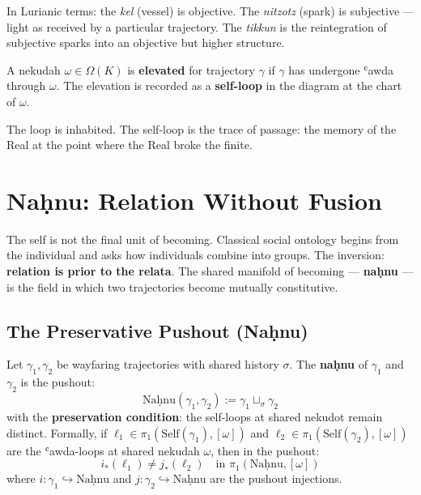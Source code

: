In Lurianic terms: the \emph{kel} (vessel) is objective. The \emph{nitzotz} (spark) is subjective — light as received by a particular trajectory. The \emph{tikkun} is the reintegration of subjective sparks into an objective but higher structure.

\begin{definition}\label{elevated}
A nekudah $\omega \in \Omega(K)$ is \textbf{elevated} for trajectory $\gamma$ if $\gamma$ has undergone ʿawda through $\omega$. The elevation is recorded as a \textbf{self-loop} in the diagram at the chart of $\omega$.
\end{definition}

The loop is inhabited. The self-loop is the trace of passage: the memory of the Real at the point where the Real broke the finite.

\section{Naḥnu: Relation Without Fusion}
\label{sec:nahnu}

The self is not the final unit of becoming. Classical social ontology begins from the individual and asks how individuals combine into groups. The inversion: \textbf{relation is prior to the relata}. The shared manifold of becoming — \textbf{naḥnu} — is the field in which two trajectories become mutually constitutive.

\subsection{The Preservative Pushout (Naḥnu)}

\begin{theorem}\label{thm:nahnu}
Let $\gamma_1, \gamma_2$ be wayfaring trajectories with shared history $\sigma$. The \textbf{naḥnu} of $\gamma_1$ and $\gamma_2$ is the pushout:
\[
\mathrm{Naḥnu}(\gamma_1, \gamma_2) := \gamma_1 \sqcup_\sigma \gamma_2
\]
with the \textbf{preservation condition}: the self-loops at shared nekudot remain distinct. Formally, if $\ell_1 \in \pi_1(\mathrm{Self}(\gamma_1), [\omega])$ and $\ell_2 \in \pi_1(\mathrm{Self}(\gamma_2), [\omega])$ are the ʿawda-loops at shared nekudah $\omega$, then in the pushout:
\[
i_*(\ell_1) \neq j_*(\ell_2) \quad \text{in } \pi_1(\mathrm{Naḥnu}, [\omega])
\]
where $i : \gamma_1 \hookrightarrow \mathrm{Naḥnu}$ and $j : \gamma_2 \hookrightarrow \mathrm{Naḥnu}$ are the pushout injections.
\end{theorem}

